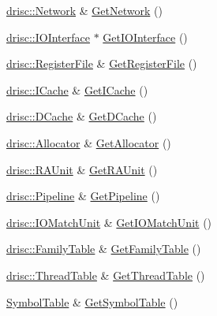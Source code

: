 \begin{DoxyCompactItemize}
\hyperlink{class_simulator_1_1drisc_1_1_network}{drisc\+::\+Network} \& \hyperlink{class_simulator_1_1_d_r_i_s_c_a3a999da614c23294f2910a83074ffa41}{Get\+Network} ()
\item 
\hyperlink{class_simulator_1_1drisc_1_1_i_o_interface}{drisc\+::\+I\+O\+Interface} $\ast$ \hyperlink{class_simulator_1_1_d_r_i_s_c_ad204679817949df15fb4f9a11fff93a7}{Get\+I\+O\+Interface} ()
\item 
\hyperlink{class_simulator_1_1drisc_1_1_register_file}{drisc\+::\+Register\+File} \& \hyperlink{class_simulator_1_1_d_r_i_s_c_ab9551cd382eb6514ad038886b3b9b8e3}{Get\+Register\+File} ()
\item 
\hyperlink{class_simulator_1_1drisc_1_1_i_cache}{drisc\+::\+I\+Cache} \& \hyperlink{class_simulator_1_1_d_r_i_s_c_a1a616117ccbc207b4dc8fa0a2e7cc1f9}{Get\+I\+Cache} ()
\item 
\hyperlink{class_simulator_1_1drisc_1_1_d_cache}{drisc\+::\+D\+Cache} \& \hyperlink{class_simulator_1_1_d_r_i_s_c_af8a0a3f96f87ae9e05056b263d3bcb97}{Get\+D\+Cache} ()
\item 
\hyperlink{class_simulator_1_1drisc_1_1_allocator}{drisc\+::\+Allocator} \& \hyperlink{class_simulator_1_1_d_r_i_s_c_a1b661496e3d894010c34d83752646e0b}{Get\+Allocator} ()
\item 
\hyperlink{class_simulator_1_1drisc_1_1_r_a_unit}{drisc\+::\+R\+A\+Unit} \& \hyperlink{class_simulator_1_1_d_r_i_s_c_a9d70618d0315f3785208549a1b6c075a}{Get\+R\+A\+Unit} ()
\item 
\hyperlink{class_simulator_1_1drisc_1_1_pipeline}{drisc\+::\+Pipeline} \& \hyperlink{class_simulator_1_1_d_r_i_s_c_a5566537e46f7b11c3698bb7f742ed49f}{Get\+Pipeline} ()
\item 
\hyperlink{class_simulator_1_1drisc_1_1_i_o_match_unit}{drisc\+::\+I\+O\+Match\+Unit} \& \hyperlink{class_simulator_1_1_d_r_i_s_c_a8e37c24fc22bb69a850d284e9e226580}{Get\+I\+O\+Match\+Unit} ()
\item 
\hyperlink{class_simulator_1_1drisc_1_1_family_table}{drisc\+::\+Family\+Table} \& \hyperlink{class_simulator_1_1_d_r_i_s_c_a2553140ff720fe2f73fda621e53feaf8}{Get\+Family\+Table} ()
\item 
\hyperlink{class_simulator_1_1drisc_1_1_thread_table}{drisc\+::\+Thread\+Table} \& \hyperlink{class_simulator_1_1_d_r_i_s_c_aa83c2387716365bee87bba0808ab2afb}{Get\+Thread\+Table} ()
\item 
\hyperlink{class_simulator_1_1_symbol_table}{Symbol\+Table} \& \hyperlink{class_simulator_1_1_d_r_i_s_c_a9c12bbe130bed7241fb94d70a32ff1d6}{Get\+Symbol\+Table} ()
\end{DoxyCompactItemize}
